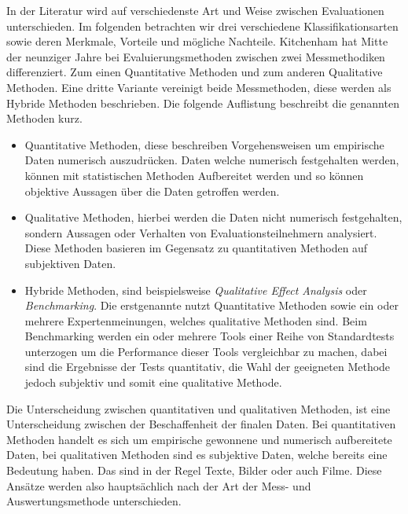 \documentclass[draft=false
              ,paper=a4
              ,twoside=false
              ,fontsize=11pt
              ,headsepline
              ,BCOR10mm
              ,DIV11
              ]{scrbook}
\begin{document}
In der Literatur wird auf verschiedenste Art und Weise zwischen Evaluationen unterschieden. Im folgenden betrachten wir drei verschiedene Klassifikationsarten sowie deren Merkmale, Vorteile und mögliche Nachteile.  
Kitchenham \cite{kitchenham_evaluating_1996-1} hat Mitte der neunziger Jahre bei Evaluierungsmethoden zwischen zwei Messmethodiken differenziert. Zum einen Quantitative Methoden und zum anderen Qualitative Methoden. Eine dritte Variante vereinigt beide Messmethoden, diese werden als Hybride Methoden beschrieben. Die folgende Auflistung beschreibt die genannten Methoden kurz.
\begin{itemize}
  \item Quantitative Methoden, diese beschreiben Vorgehensweisen um empirische Daten numerisch auszudrücken. Daten welche numerisch festgehalten werden, können mit statistischen Methoden Aufbereitet werden und so können objektive Aussagen über die Daten getroffen werden. 
  \item Qualitative Methoden, hierbei werden die Daten nicht numerisch festgehalten, sondern Aussagen oder Verhalten von Evaluationsteilnehmern analysiert. Diese Methoden basieren im Gegensatz zu quantitativen Methoden auf subjektiven Daten.
  \item Hybride Methoden, sind beispielsweise \textit{Qualitative Effect Analysis} oder \textit{Benchmarking}. Die erstgenannte nutzt Quantitative Methoden sowie ein oder mehrere Expertenmeinungen, welches qualitative Methoden sind. Beim Benchmarking werden ein oder mehrere Tools einer Reihe von Standardtests unterzogen um die Performance dieser Tools vergleichbar zu machen, dabei sind die Ergebnisse der Tests quantitativ, die Wahl der geeigneten Methode jedoch subjektiv und somit eine qualitative Methode.
\end{itemize}
Die Unterscheidung zwischen quantitativen und qualitativen Methoden, ist eine Unterscheidung zwischen der Beschaffenheit der finalen Daten. Bei quantitativen Methoden handelt es sich um empirische gewonnene und numerisch aufbereitete Daten, bei qualitativen Methoden sind es subjektive Daten, welche bereits eine Bedeutung haben. Das sind in der Regel Texte, Bilder oder auch Filme. Diese Ansätze werden also hauptsächlich nach der Art der Mess- und Auswertungsmethode unterschieden. 
%
\end{document}
